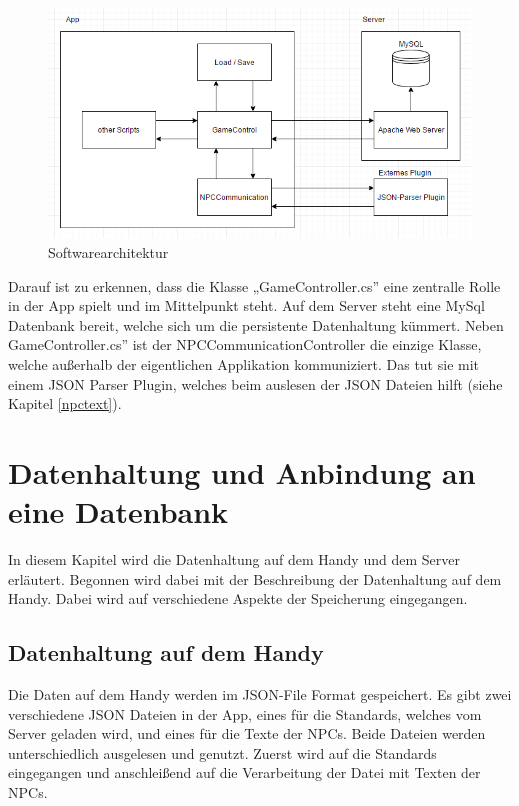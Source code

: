 		\begin{figure}[htbp]
			\centering 
			\label{architecture}
			\includegraphics[width=13cm]{pics/archtecture.png}
			\caption{Softwarearchitektur}
		\end{figure}	

		Darauf ist zu erkennen, dass die Klasse „GameController.cs” eine zentralle Rolle in der App spielt und im Mittelpunkt steht. Auf dem Server steht eine MySql Datenbank bereit, welche sich um die persistente Datenhaltung kümmert. Neben GameController.cs” ist der NPCCommunicationController die einzige Klasse, welche außerhalb der eigentlichen Applikation kommuniziert. Das tut sie mit einem \ac{JSON} Parser Plugin, welches beim auslesen der \ac{JSON} Dateien hilft (siehe Kapitel \ref{npctext}).	

	\section{Datenhaltung und Anbindung an eine Datenbank}
		In diesem Kapitel wird die Datenhaltung auf dem Handy und dem Server erläutert. Begonnen wird dabei mit der Beschreibung der Datenhaltung auf dem Handy. Dabei wird auf verschiedene Aspekte der Speicherung eingegangen.

		\subsection{Datenhaltung auf dem Handy}
			Die Daten auf dem Handy werden im \ac{JSON}-File Format gespeichert. Es gibt zwei verschiedene \ac{JSON} Dateien in der App, eines für die Standards, welches vom Server geladen wird, und eines für die Texte der \acp{NPC}. Beide Dateien werden unterschiedlich ausgelesen und genutzt. Zuerst wird auf die Standards eingegangen und anschleißend auf die Verarbeitung der Datei mit Texten der \acp{NPC}. 

